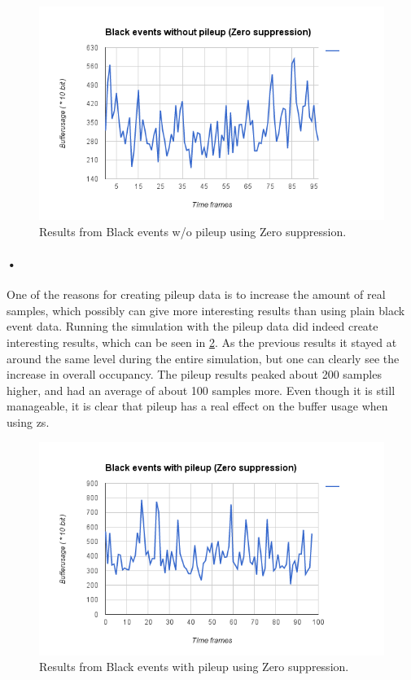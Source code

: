 \documentclass[a4paper, 12pt]{report}\dfrac{\right }{•}
\begin{document}
\begin{figure}[h!]
	\centering
		\includegraphics[width=1.0\textwidth]{images/blackevents-zs.png}
		\caption{Results from Black events w/o pileup using Zero suppression.}
		\label{fig:blackevents-zs}
\end{figure}

\paragraph{•}
One of the reasons for creating pileup data is to increase the amount of real samples, which possibly can give more interesting results than using plain black event data.
Running the simulation with the pileup data did indeed create interesting results, which can be seen in \ref{fig:blackevents-pileup-zs}.
As the previous results it stayed at around the same level during the entire simulation, but one can clearly see the increase in overall occupancy.
The pileup results peaked about 200 samples higher, and had an average of about 100 samples more.
Even though it is still manageable, it is clear that pileup has a real effect on the buffer usage when using \gls{zs}.

\begin{figure}[h!]
	\centering
		\includegraphics[width=1.0\textwidth]{images/blackevents-pileup-zs.png}
		\caption{Results from Black events with pileup using Zero suppression.}
		\label{fig:blackevents-pileup-zs}
\end{figure}
\end{document}
